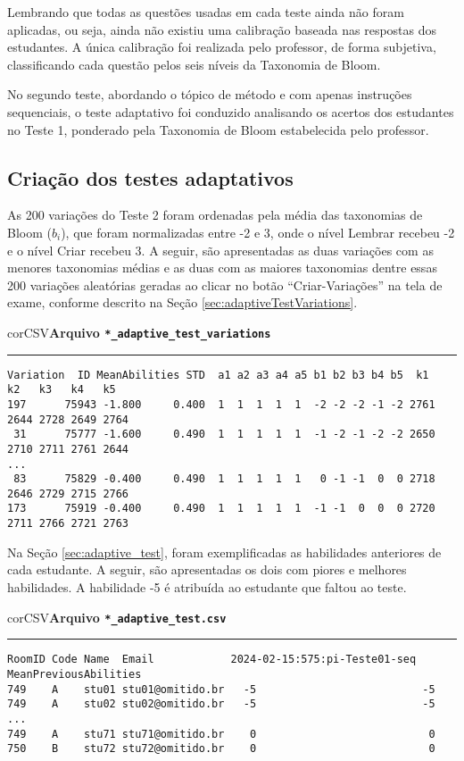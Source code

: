 Lembrando que todas as questões usadas em cada teste ainda não foram aplicadas, ou seja, ainda não existiu uma calibração baseada nas respostas dos estudantes. A única calibração foi realizada pelo professor, de forma subjetiva, classificando cada questão pelos seis níveis da Taxonomia de Bloom.

No segundo teste, abordando o tópico de método e com apenas instruções sequenciais, o teste adaptativo foi conduzido analisando os acertos dos estudantes no Teste 1, ponderado pela Taxonomia de Bloom estabelecida pelo professor.

\subsection{Criação dos testes adaptativos}

As 200 variações do Teste 2 foram ordenadas pela média das taxonomias de Bloom ($b_i$), que foram normalizadas entre -2 e 3, onde o nível Lembrar recebeu -2 e o nível Criar recebeu 3. A seguir, são apresentadas as duas variações com as menores taxonomias médias e as duas com as maiores taxonomias dentre essas 200 variações aleatórias geradas ao clicar no botão ``Criar-Variações'' na tela de exame, conforme descrito na Seção \ref{sec:adaptiveTestVariations}.

\begin{myboxCode}{corCSV}{\textbf{Arquivo \texttt{*\_adaptive\_test\_variations}}}\vspace{3mm}
    \hrule
    \begin{verbatim}
Variation  ID MeanAbilities STD  a1 a2 a3 a4 a5 b1 b2 b3 b4 b5  k1   k2   k3   k4   k5
197      75943 -1.800     0.400  1  1  1  1  1  -2 -2 -2 -1 -2 2761 2644 2728 2649 2764
 31      75777 -1.600     0.490  1  1  1  1  1  -1 -2 -1 -2 -2 2650 2710 2711 2761 2644
...
 83      75829 -0.400     0.490  1  1  1  1  1   0 -1 -1  0  0 2718 2646 2729 2715 2766
173      75919 -0.400     0.490  1  1  1  1  1  -1 -1  0  0  0 2720 2711 2766 2721 2763
\end{verbatim}
\end{myboxCode}

Na Seção \ref{sec:adaptive_test}, foram exemplificadas as habilidades anteriores de cada estudante. A seguir, são apresentadas os dois com piores e melhores habilidades. A habilidade -5 é atribuída ao estudante que faltou ao teste.

\begin{myboxCode}{corCSV}{\textbf{Arquivo \texttt{*\_adaptive\_test.csv}}}\vspace{3mm}
\hrule
\begin{verbatim}
RoomID Code Name  Email            2024-02-15:575:pi-Teste01-seq MeanPreviousAbilities
749	   A    stu01 stu01@omitido.br   -5                          -5
749	   A    stu02 stu02@omitido.br   -5                          -5
... 
749    A    stu71 stu71@omitido.br    0                           0
750    B    stu72 stu72@omitido.br    0                           0
\end{verbatim}
\end{myboxCode}


